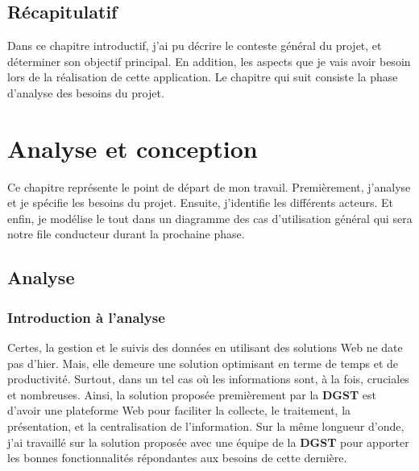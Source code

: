 \documentclass[a4paper]{report}
\begin{document}
\begin{doublespace}
    \section{Récapitulatif}

    Dans ce chapitre introductif, j'ai pu décrire le conteste général du
    projet, et
    déterminer son objectif principal. En addition, les aspects que je vais
    avoir besoin lors de la réalisation de cette application.
    Le chapitre qui suit consiste la phase d'analyse des besoins du projet.
    \newpage
    \chapter{Analyse et conception}
    \renewcommand{\headrulewidth}{1pt}
    \fancyhead[L]{\hspace*{5cm}}

    Ce chapitre représente le point de départ de mon travail. Premièrement,
    j'analyse et
    je spécifie les besoins du projet. Ensuite, j'identifie les différents
    acteurs. Et enfin, je
    modélise le tout dans un diagramme des cas d’utilisation général qui
    sera notre file conducteur
    durant la prochaine phase.
    \section{Analyse}
    \subsection{Introduction à l'analyse}
    Certes, la gestion et le suivis des données en utilisant des solutions
    Web ne date pas d'hier. Mais,
    elle demeure une solution optimisant en terme de temps et de
    productivité. Surtout,
    dans un tel cas où les informations sont, à la fois, cruciales et
    nombreuses. Ainsi, la solution proposée premièrement par la \textbf{DGST} est
    d'avoir une plateforme Web pour faciliter la collecte,
    le traitement, la présentation, et la centralisation de l'information.
    Sur la même longueur d'onde, j'ai
    travaillé sur la solution proposée avec une équipe de la \textbf{DGST}
    pour apporter les bonnes
    fonctionnalités répondantes aux besoins de cette dernière.

\end{doublespace}
\end{document}
